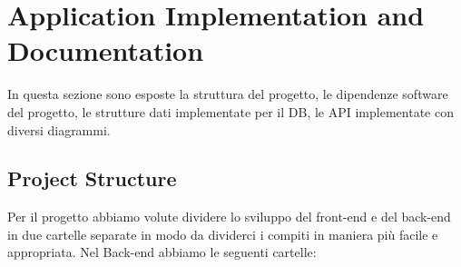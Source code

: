 \section{Application Implementation and Documentation}
In questa sezione sono esposte la struttura del progetto, le dipendenze software del progetto, le strutture dati implementate per il DB, le API implementate con diversi diagrammi.

\subsection{Project Structure}
Per il progetto abbiamo volute dividere lo sviluppo del front-end e del back-end in due cartelle separate in modo da dividerci i compiti in maniera più facile e appropriata. Nel Back-end abbiamo le seguenti cartelle:


